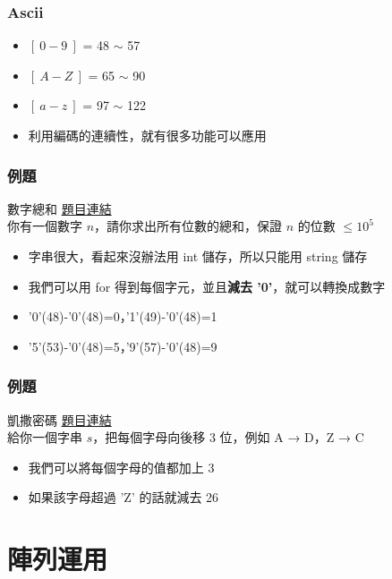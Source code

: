 \documentclass[mathserif]{beamer}
\begin{document}
\begin{frame}
    \frametitle{Ascii}
    \begin{itemize}
        \item $[\ 0-9\ ]$ = 48 $\sim$ 57
        \item $[\ A-Z\ ]$ = 65 $\sim$ 90
        \item $[\ a-z\ ]$ = 97 $\sim$ 122
        \item 利用編碼的連續性，就有很多功能可以應用
    \end{itemize}
\end{frame}

\begin{frame}
    \frametitle{例題}
    \begin{block}{數字總和}
        \href{https://codeforces.com/group/S6XjkGb6qB/contest/403070/problem/C}{題目連結}\\
        你有一個數字 $n$，請你求出所有位數的總和，保證 $n$ 的位數 $\leq 10^5$
    \end{block}
    \begin{itemize}
        \item<2-> 字串很大，看起來沒辦法用 int 儲存，所以只能用 string 儲存
        \item<2-> 我們可以用 for 得到每個字元，並且\textbf{減去 '0'}，就可以轉換成數字
        \item<2-> '0'(48)-'0'(48)=0，'1'(49)-'0'(48)=1
        \item<2-> '5'(53)-'0'(48)=5，'9'(57)-'0'(48)=9
    \end{itemize}
\end{frame}

\begin{frame}
    \frametitle{例題}
    \begin{block}{凱撒密碼}
        \href{https://zerojudge.tw/ShowProblem?problemid=b516}{題目連結}\\
        給你一個字串 $s$，把每個字母向後移 3 位，例如 A → D，Z → C
    \end{block}
    \begin{itemize}
        \item<2-> 我們可以將每個字母的值都加上 3
        \item<2-> 如果該字母超過 'Z' 的話就減去 26
    \end{itemize}
\end{frame}

\section{陣列運用}
\end{document}
